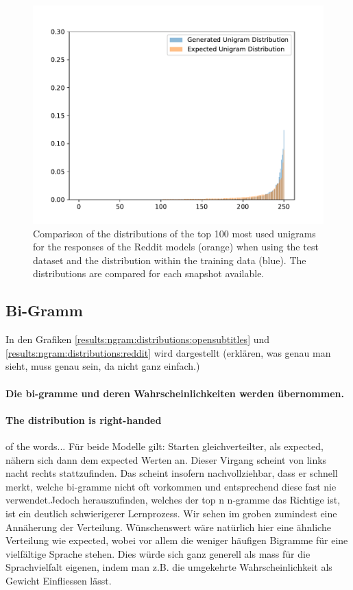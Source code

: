\begin{figure}[H]
	\includegraphics[width=\linewidth]{img/plots/reddit/unigram_distribution_comparison_step_3000000.pdf}
	\centering
	\small
	\endminipage\hfill
	\caption{Comparison of the distributions of the top 100 most used unigrams for the responses of the Reddit models (orange) when using the test dataset and the distribution within the training data (blue). The distributions are compared for each snapshot available.}
	\label{results:unigram:distributions:reddit}
\end{figure}

\subsection{Bi-Gramm}
In den Grafiken \ref{results:ngram:distributions:opensubtitles} und \ref{results:ngram:distributions:reddit} wird dargestellt (erklären, was genau man sieht, muss genau sein, da nicht ganz einfach.)
\paragraph{Die bi-gramme und deren Wahrscheinlichkeiten werden übernommen.}
\paragraph{The distribution is right-handed} of the words... Für beide Modelle gilt: Starten gleichverteilter, als expected, nähern sich dann dem expected Werten an. Dieser Virgang scheint von links nacht rechts stattzufinden. Das scheint insofern nachvollziehbar, dass er schnell merkt, welche bi-gramme nicht oft vorkommen und entsprechend diese fast nie verwendet.Jedoch herauszufinden, welches der top n n-gramme das Richtige ist, ist ein deutlich schwierigerer Lernprozess. Wir sehen im groben zumindest eine Annäherung der Verteilung. Wünschenswert wäre natürlich hier eine ähnliche Verteilung wie expected, wobei vor allem die weniger häufigen Bigramme für eine vielfältige Sprache stehen. Dies würde sich ganz generell als mass für die Sprachvielfalt eigenen, indem man z.B. die umgekehrte Wahrscheinlichkeit als Gewicht Einfliessen lässt.

